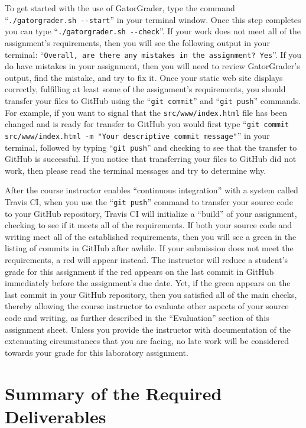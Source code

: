 \documentclass[11pt]{article}
\newcommand{\mainprogramsource}{\lstinline{src/www/index.html}}
\newcommand{\gatorgraderstart}{\command{./gatorgrader.sh --start}}
\newcommand{\gatorgradercheck}{\command{./gatorgrader.sh --check}}
\newcommand{\gitcommit}{\command{git commit}}
\newcommand{\gitpush}{\command{git push}}
\newcommand{\gitcommitmainprogram}{\command{git commit src/www/index.html -m "Your
descriptive commit message"}}
\newcommand{\command}[1]{``\lstinline{#1}''}
\newcommand{\step}[1]{``{#1}''}
\newcommand{\checkmark}{\ding{51}}
\newcommand{\naughtmark}{\ding{55}}
\begin{document}
To get started with the use of GatorGrader, type the command \gatorgraderstart{}
in your terminal window. Once this step completes you can type
\gatorgradercheck{}. If your work does not meet all of the assignment's
requirements, then you will see the following output in your terminal:
\command{Overall, are there any mistakes in the assignment? Yes}. If you do have
mistakes in your assignment, then you will need to review GatorGrader's output,
find the mistake, and try to fix it. Once your static web site displays
correctly, fulfilling at least some of the assignment's requirements, you should
transfer your files to GitHub using the \gitcommit{} and \gitpush{} commands.
For example, if you want to signal that the \mainprogramsource{} file has been
changed and is ready for transfer to GitHub you would first type
\gitcommitmainprogram{} in your terminal, followed by typing \gitpush{} and
checking to see that the transfer to GitHub is successful. If you notice that
transferring your files to GitHub did not work, then please read the terminal
messages and try to determine why.

After the course instructor enables \step{continuous integration} with a system
called Travis CI, when you use the \gitpush{} command to transfer your source
code to your GitHub repository, Travis CI will initialize a \step{build} of your
assignment, checking to see if it meets all of the requirements. If both your
source code and writing meet all of the established requirements, then you will
see a green \checkmark{} in the listing of commits in GitHub after awhile. If
your submission does not meet the requirements, a red \naughtmark{} will appear
instead. The instructor will reduce a student's grade for this assignment if the
red \naughtmark{} appears on the last commit in GitHub immediately before the
assignment's due date. Yet, if the green \checkmark{} appears on the last commit
in your GitHub repository, then you satisfied all of the main checks, thereby
allowing the course instructor to evaluate other aspects of your source code and
writing, as further described in the \step{Evaluation} section of this
assignment sheet. Unless you provide the instructor with documentation of the
extenuating circumstances that you are facing, no late work will be considered
towards your grade for this laboratory assignment.

\section*{Summary of the Required Deliverables}
\end{document}
